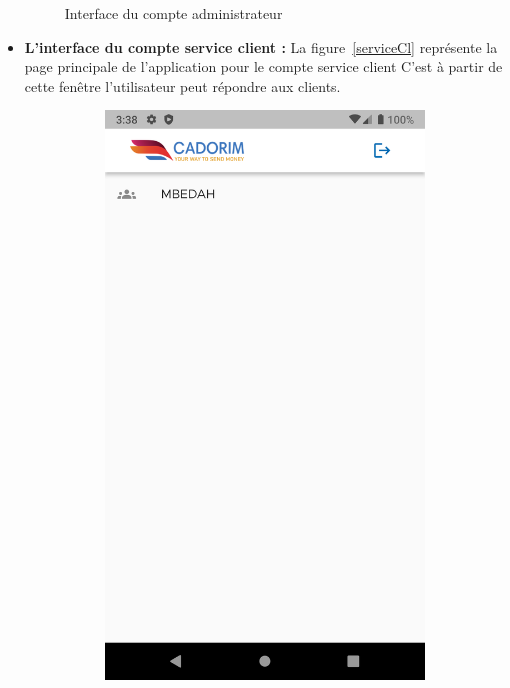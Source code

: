 \begin{itemize}[label=$\ast$]
\begin{figure}
	\caption{Interface du compte administrateur
}
\label{Home}
\end{figure}
\newpage
\item \textbf{L’interface du compte service client
	:} 
La figure~\ref{serviceCl} représente la page principale de l’application pour le compte service client C’est à partir de cette fenêtre l'utilisateur peut répondre aux clients.
\begin{figure}
	\centering
\begin{subfigure}{0.3\textwidth}
	\includegraphics[width=\hsize, valign=m ]{./Template LaTeX/Images/From_emu/s_Home.png}

\end{subfigure}
\end{figure}
\end{itemize}
